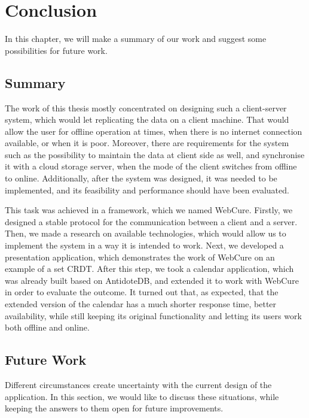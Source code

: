 \chapter{Conclusion}
\label{Conclusion}

In this chapter, we will make a summary of our work and suggest some possibilities for future work.

\section{Summary}
\label{summary}

The work of this thesis mostly concentrated on designing such a client-server system, which would let replicating the data on a client machine. That would allow the user for offline operation at times, when there is no internet connection available, or when it is poor. Moreover, there are requirements for the system such as the possibility to maintain the data at client side as well, and synchronise it with a cloud storage server, when the mode of the client switches from offline to online. Additionally, after the system was designed, it was needed to be implemented, and its feasibility and performance should have been evaluated.

This task was achieved in a framework, which we named WebCure. Firstly, we designed a stable protocol for the communication between a client and a server. Then, we made a research on available technologies, which would allow us to implement the system in a way it is intended to work. Next, we developed a presentation application, which demonstrates the work of WebCure on an example of a set CRDT. After this step, we took a calendar application, which was already built based on AntidoteDB, and extended it to work with WebCure in order to evaluate the outcome. It turned out that, as expected, that the extended version of the calendar has a much shorter response time, better availability, while still keeping its original functionality and letting its users work both offline and online. 

\section{Future Work}
\label{futurework}

Different circumstances create uncertainty with the current design of the application. In this section, we would like to discuss these situations, while keeping the answers to them open for future improvements.

